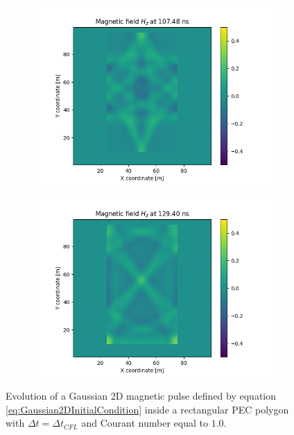 \documentclass[12pt, oneside]{book}
\begin{document}
\begin{figure}[h!]
    \begin{subfigure}[b]{0.49\textwidth}
        \centering
        \includegraphics[width=\textwidth]{Imagenes/CFDTD2D_GaussianStability5.png}
    \end{subfigure}
    \begin{subfigure}[b]{0.49\textwidth}
        \centering
        \includegraphics[width=\textwidth]{Imagenes/CFDTD2D_GaussianStability6.png}
    \end{subfigure}
    \caption{Evolution of a Gaussian 2D magnetic pulse defined by equation \ref{eq:Gaussian2DInitialCondition} inside a rectangular PEC polygon with $\Delta t = \Delta t_{CFL}$ and Courant number equal to $1.0$.}
    \label{fig:CFDTD2D_GaussianStability}
\end{figure}
\end{document}
